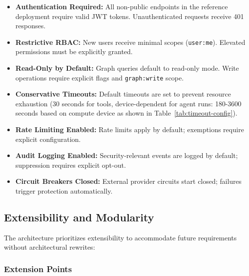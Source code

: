 \documentclass[a4paper,twoside]{sapthesis}
\begin{document}
\begin{itemize}
    \item \textbf{Authentication Required:} All non-public endpoints in the reference deployment require valid JWT tokens. Unauthenticated requests receive 401 responses.
    
    \item \textbf{Restrictive RBAC:} New users receive minimal scopes (\texttt{user:me}). Elevated permissions must be explicitly granted.
    
    \item \textbf{Read-Only by Default:} Graph queries default to read-only mode. Write operations require explicit flags and \texttt{graph:write} scope.
    
    \item \textbf{Conservative Timeouts:} Default timeouts are set to prevent resource exhaustion (30 seconds for tools, device-dependent for agent runs: 180-3600 seconds based on compute device as shown in Table~\ref{tab:timeout-config}).
    
    \item \textbf{Rate Limiting Enabled:} Rate limits apply by default; exemptions require explicit configuration.
    
    \item \textbf{Audit Logging Enabled:} Security-relevant events are logged by default; suppression requires explicit opt-out.
    
    \item \textbf{Circuit Breakers Closed:} External provider circuits start closed; failures trigger protection automatically.
\end{itemize}

\subsection{Extensibility and Modularity}
\label{subsec:extensibility}

The architecture prioritizes extensibility to accommodate future requirements without architectural rewrites:

\subsubsection{Extension Points}
\end{document}
